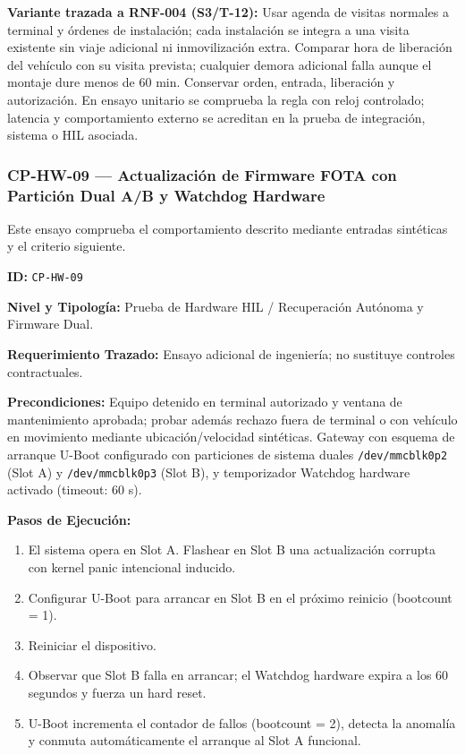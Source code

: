 \par\noindent \textbf{Variante trazada a RNF-004 (S3/T-12):} Usar agenda de visitas normales a terminal y órdenes de instalación; cada instalación se integra a una visita existente sin viaje adicional ni inmovilización extra. Comparar hora de liberación del vehículo con su visita prevista; cualquier demora adicional falla aunque el montaje dure menos de 60 min. Conservar orden, entrada, liberación y autorización. En ensayo unitario se comprueba la regla con reloj controlado; latencia y comportamiento externo se acreditan en la prueba de integración, sistema o HIL asociada.\par


\subsubsection*{CP-HW-09 — Actualización de Firmware FOTA con Partición Dual A/B y Watchdog Hardware}\label{sec:9-cp-hw-09}
Este ensayo comprueba el comportamiento descrito mediante entradas sintéticas y el criterio siguiente.

\par\noindent \textbf{ID:} \texttt{CP-\allowbreak{}HW-\allowbreak{}09}\par
\par\noindent \textbf{Nivel y Tipología:} Prueba de Hardware HIL / Recuperación Autónoma y Firmware Dual.\par
\par\noindent \textbf{Requerimiento Trazado:} Ensayo adicional de ingeniería; no sustituye controles contractuales.\par
\par\noindent \textbf{Precondiciones:} Equipo detenido en terminal autorizado y ventana de mantenimiento aprobada; probar además rechazo fuera de terminal o con vehículo en movimiento mediante ubicación/velocidad sintéticas. Gateway con esquema de arranque U-Boot configurado con particiones de sistema duales \texttt{/dev/mmcblk0p2} (Slot A) y \texttt{/dev/mmcblk0p3} (Slot B), y temporizador Watchdog hardware activado (timeout: 60 s).\par
\par\noindent \textbf{Pasos de Ejecución:}\par
\begin{enumerate}
\item El sistema opera en Slot A. Flashear en Slot B una actualización corrupta con kernel panic intencional inducido.
\item Configurar U-Boot para arrancar en Slot B en el próximo reinicio (bootcount = 1).
\item Reiniciar el dispositivo.
\item Observar que Slot B falla en arrancar; el Watchdog hardware expira a los 60 segundos y fuerza un hard reset.
\item U-Boot incrementa el contador de fallos (bootcount = 2), detecta la anomalía y conmuta automáticamente el arranque al Slot A funcional.
\end{enumerate}

